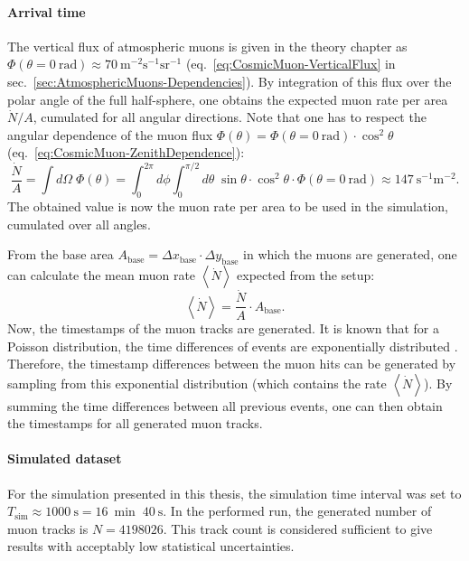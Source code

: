 \paragraph{Arrival time}
The vertical flux of atmospheric muons is given in the theory chapter as $\Phi(\theta=\SI{0}{\radian}) \approx \SI{70}{\meter^{-2} \second^{-1} \steradian^{-1}}$ (eq.\ \ref{eq:CosmicMuon-VerticalFlux} in sec.\ \ref{sec:AtmosphericMuons-Dependencies}). By integration of this flux over the polar angle of the full half-sphere, one obtains the expected muon rate per area $\dot{N}/A$, cumulated for all angular directions. Note that one has to respect the angular dependence of the muon flux $\Phi(\theta)=\Phi(\theta=\SI{0}{\radian})\cdot\cos^2\theta$ (eq.\ \ref{eq:CosmicMuon-ZenithDependence}):
\begin{equation}
\frac{\dot{N}}{A} = \int d\Omega\; \Phi(\theta) = \int_{0}^{2\pi} d\phi \int_{0}^{\pi/2} d\theta\; \sin\theta\cdot\cos^2\theta\cdot\Phi(\theta=\SI{0}{\radian}) \approx \SI{147}{\second^{-1}\meter^{-2}}.
\end{equation}
The obtained value is now the muon rate per area to be used in the simulation, cumulated over all angles.
\par From the base area $A_\text{base} = \Delta x_\text{base}\cdot\Delta y_\text{base}$ in which the muons are generated, one can calculate the mean muon rate $\left\langle \dot{N} \right\rangle$ expected from the setup:
\begin{equation}
\left\langle \dot{N} \right\rangle = \frac{\dot{N}}{A} \cdot A_\text{base}.
\end{equation}
Now, the timestamps of the muon tracks are generated. It is known that for a Poisson distribution, the time differences of events are exponentially distributed \cite{Book-KolanoskiWermes}. Therefore, the timestamp differences between the muon hits can be generated by sampling from this exponential distribution (which contains the rate $\left\langle \dot{N} \right\rangle$). By summing the time differences between all previous events, one can then obtain the timestamps for all generated muon tracks.
\paragraph{Simulated dataset}
For the simulation presented in this thesis, the simulation time interval was set to $T_\text{sim}\approx\SI{1000}{\second}=\SI{16}{\min}\;\SI{40}{\second}$. In the performed run, the generated number of muon tracks is $N=\num{4198026}$. This track count is considered sufficient to give results with acceptably low statistical uncertainties.

